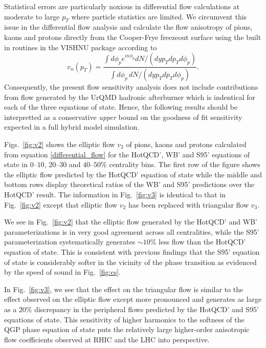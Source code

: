 \documentclass[aps,prc,reprint,amsmath,nofootinbib,superscriptaddress]{revtex4-1}
\begin{document}
Statistical errors are particularly noxious in differential flow calculations at moderate to large $p_T$ where particle statistics are limited. We circumvent this issue in the differential flow 
analysis and calculate the flow anisotropy of pions, kaons and protons directly from the Cooper-Frye freezeout surface using the built in routines in the VISHNU package according to
\begin{equation}
 \label{differential_flow}
 v_n(p_T) = \frac{\int d\phi_p e^{i n \phi_p} dN/(dy p_T dp_T d\phi_p)}{\int d\phi_p\, dN/(dy p_T dp_T d\phi_p)}.
\end{equation}
Consequently, the present flow sensitivity analysis does not include contributions from flow generated by the UrQMD hadronic afterburner which is indentical for each of the three equations of state. Hence, the following
results should be interpretted as a conservative \emph{upper} bound on the goodness of fit sensitivity expected in a full hybrid model simulation.

Figs.~\ref{fig:v2} shows the elliptic flow $v_2$ of pions, kaons and protons calculated from equation \eqref{differential_flow} for the HotQCD', WB' and S95' equations of state in $0$--$10$, $20$--$30$ and $40$--$50\%$ centrality bins. 
The first row of the figure shows the elliptic flow predicted by the HotQCD' equation of state while the middle and bottom rows display theoretical ratios of the WB' and S95' predictions over the HotQCD' result. The information
in Fig.~\ref{fig:v3} is identical to that in Fig.~\ref{fig:v2} except that elliptic flow $v_2$ has been replaced with triangular flow $v_3$.

We see in Fig.~\ref{fig:v2} that the elliptic flow generated by the HotQCD' and WB' parameterizations is in very good agreement across all centralities, while the S95' parameterization systematically generates $\sim 10\%$ less 
flow than the HotQCD' equation of state. This is consistent with previous findings that the S95' equation of state is considerably softer in the vicinity of the phase transition as evidenced by the 
speed of sound in Fig.~\ref{fig:cs}. 

In Fig.~\ref{fig:v3}, we see that the effect on the triangular flow is similar to the effect observed on the elliptic flow except more pronounced and generates as large as a $20\%$ discrepancy in the peripheral flows
predicted by the HotQCD' and S95' equations of state. This sensitivity of higher harmonics to the softness of the QGP phase equation of state puts the relatively large higher-order anisotropic flow coefficients observed at
RHIC and the LHC into perspective. 
\end{document}
